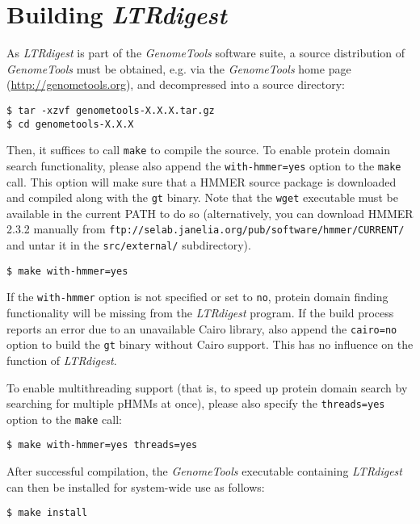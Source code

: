 \documentclass[12pt,titlepage]{article}
\newcommand{\LTRdigest}{\textit{LTRdigest}\xspace}
\newcommand{\GenomeTools}{\textit{GenomeTools}\xspace}
\newcommand{\Gt}{\texttt{gt}\xspace}
\begin{document}
\section{Building \emph{LTRdigest}} \label{Building}

As \LTRdigest is part of the \GenomeTools software suite, a source distribution of \GenomeTools must be obtained, e.g. via the \GenomeTools home page (\url{http://genometools.org}), and decompressed into a source directory:

\begin{verbatim}
$ tar -xzvf genometools-X.X.X.tar.gz
$ cd genometools-X.X.X
\end{verbatim}

Then, it suffices to call \texttt{make} to compile the source. To enable protein
domain search functionality, please also append the \texttt{with-hmmer=yes}
option to the \texttt{make} call. This option will make sure that a HMMER source
package is downloaded and compiled along with the \Gt binary. Note that the
\texttt{wget} executable must be available in the current PATH to do so
(alternatively, you can download HMMER 2.3.2 manually from
\texttt{ftp://selab.janelia.org/pub/software/hmmer/CURRENT/} and untar it in the
\texttt{src/external/} subdirectory).

\begin{verbatim}
$ make with-hmmer=yes
\end{verbatim}%

If the \texttt{with-hmmer} option is not specified or set to \texttt{no}, protein domain finding functionality will be missing from the \LTRdigest program. If the build process reports an error due to an unavailable Cairo library, also append the \texttt{cairo=no} option to build the \Gt binary without Cairo support. This has no influence on the function of \LTRdigest .

To enable multithreading support (that is, to speed up protein domain search by searching for multiple pHMMs at once), please also specify the \texttt{threads=yes} option to the \texttt{make} call:

\begin{verbatim}
$ make with-hmmer=yes threads=yes
\end{verbatim}%

After successful compilation, the \GenomeTools executable containing \LTRdigest can then be installed for system-wide use as follows:

\begin{verbatim}
$ make install
\end{verbatim}%
\end{document}
